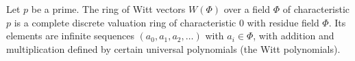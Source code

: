 Let $p$ be a prime. The ring of Witt vectors $W(\Phi)$ over a field $\Phi$ of characteristic $p$ is a complete discrete valuation ring of characteristic $0$ with residue field $\Phi$. Its elements are infinite sequences $(a_0, a_1, a_2, \ldots)$ with $a_i \in \Phi$, with addition and multiplication defined by certain universal polynomials (the Witt polynomials).
